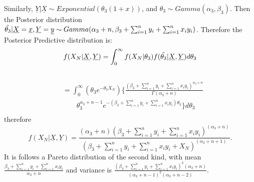 \documentclass[12pt]{article}    %
\numberwithin{equation}{section}
\begin{document}
Similarly, $\underline{Y}|\underline{X} \sim Exponential(\theta_3(1+x))$, and $\theta_3 \sim Gamma(\alpha_3, \beta_3)$. Then the Posterior distribution $\Tilde{\theta_3}|\underline{X}=\underline{x},\underline{Y}=\underline{y} \sim Gamma(\alpha_3+n,  \beta_3+\sum^n_{i=1}y_i+\sum^n_{i=1}x_iy_i)$.
Therefore the Posterior Predictive distribution is:\\
\begin{equation*}
f(X_N|\underline{X},\underline{Y}) = \int_0^{\infty}f(X_N|\theta_3)f(\Tilde{\theta_3}|\underline{X},\underline{Y})d\theta_3
\end{equation*}\\
\begin{equation*}
\begin{split}
&= \int_0^{\infty}\left(\theta_3 e^{-\theta_3X_N}\right)\{\frac{(\beta_3+\sum^n_{i=1}{y_i}+\sum^n_{i=1}{x_iy_i})^{\alpha_3+n}}{\Gamma(\alpha_3+n)} \\
& ~~~~~~~~~ \theta_3^{\alpha_3+n-1}e^{-(\beta_3+\sum^n_{i=1}{y_i}+\sum^n_{i=1}{x_iy_i})\theta_3}\}d\theta_3 \\
\end{split}
\end{equation*}
therefore
\begin{equation*}
f(X_N|\underline{X},\underline{Y}) = \frac{(\alpha_3+n)(\beta_3+\sum^n_{i=1}{y_i}+\sum^n_{i=1}{x_iy_i})^{(\alpha_3+n)}}{(\beta_3+\sum^n_{i=1}y_i+\sum^n_{i=1}x_iy_i+X_N)^{(\alpha_3+n+1)}}.
\end{equation*}
It is follows a Pareto distribution of the second kind, with mean $\frac{\beta_3+\sum^n_{i=1}{y_i}+\sum^n_{i=1}{x_iy_i}}{\alpha_3+n}$ and variance is $\frac{(\beta_3+\sum^n_{i=1}{y_i}+\sum^n_{i=1}{x_iy_i})^2(\alpha_3+n)}{(\alpha_3+n-1)^2(\alpha_3+n-2)}$.
\end{document}
